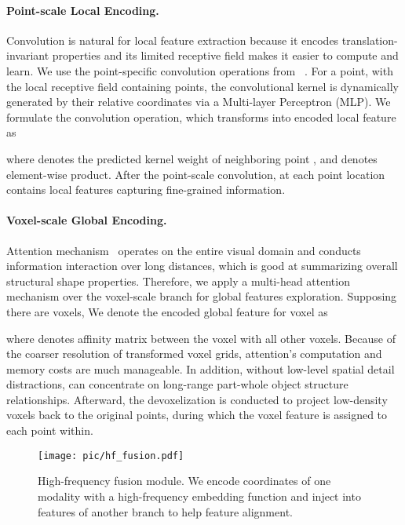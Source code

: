 \documentclass[sigconf]{acmart}
\begin{document}
\paragraph{Point-scale Local Encoding.} Convolution is natural for local feature extraction because it encodes translation-invariant properties and its limited receptive field makes it easier to compute and learn.  We use the point-specific convolution operations from ~\cite{howard2017mobilenets}. For a point,  with the local receptive field containing  points, the convolutional kernel is dynamically generated by their relative coordinates via a Multi-layer Perceptron (MLP).
We formulate the convolution operation, which transforms  into encoded local feature  as

where  denotes the predicted kernel weight of neighboring point , and  denotes element-wise product. After the point-scale convolution,  at each point location contains local features capturing fine-grained information.

\paragraph{Voxel-scale Global Encoding.}
Attention mechanism~\cite{bahdanau2014neural} operates on the entire visual domain and conducts information interaction over long distances, which is good at summarizing overall structural shape properties. Therefore, we apply a multi-head attention mechanism over the voxel-scale branch for global features exploration. Supposing there are  voxels, We denote the encoded global feature for voxel  as

where  denotes affinity matrix between the voxel  with all other voxels.  Because of the coarser resolution of transformed voxel grids, attention's computation and memory costs are much manageable. In addition, without low-level spatial detail distractions,  can concentrate on long-range part-whole object structure relationships. Afterward, the devoxelization is conducted to project low-density voxels back to the original points, during which the voxel feature is assigned to each point within.


\begin{figure*}[t]
  \centering
\texttt{[image: pic/hf\_fusion.pdf]}
  \caption{High-frequency fusion module. We encode coordinates of one modality with a high-frequency embedding function and inject into features of another branch to help feature alignment.}
    \label{fig:hf_fusion}
    \vspace{-0.5cm}
\end{figure*}
\end{document}
